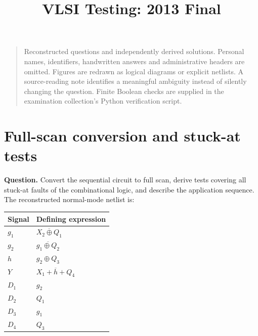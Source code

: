 \documentclass[11pt]{article}
\begin{document}
\title{VLSI Testing: 2013 Final}\author{}\date{}\maketitle\begin{quote}\small
Reconstructed questions and independently derived solutions. Personal names, identifiers,
handwritten answers and administrative headers are omitted. Figures are redrawn as
logical diagrams or explicit netlists. A source-reading note identifies a meaningful
ambiguity instead of silently changing the question. Finite Boolean checks
are supplied in the examination collection's Python verification script.
\end{quote}

\section{Full-scan conversion and stuck-at tests}
\textbf{Question.} Convert the sequential circuit to full scan, derive tests
covering all stuck-at faults of the combinational logic, and describe the
application sequence. The reconstructed normal-mode netlist is:
\begin{center}\begin{tabular}{ll}\toprule Signal & Defining expression\\\midrule
$g_1$ & $\overline{X_2\oplus Q_1}$\\
$g_2$ & $\overline{g_1\oplus Q_2}$\\
$h$ & $g_2\oplus Q_3$\\
$Y$ & $\overline{X_1+h+Q_4}$\\
$D_1$ & $g_2$\\
$D_2$ & $Q_1$\\
$D_3$ & $g_1$\\
$D_4$ & $Q_3$\\
\bottomrule\end{tabular}\end{center}
\begin{center}\end{center}
\end{document}
